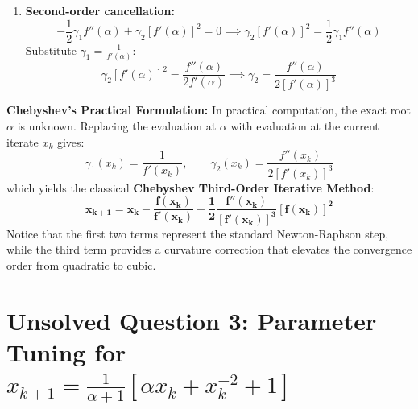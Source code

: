 \documentclass[11pt,a4paper]{article}
\numberwithin{equation}{section}
\begin{document}
\begin{solbox}
\begin{enumerate}[leftmargin=2em]
\begin{equation}
        1 - \gamma_1 f'(\alpha) = 0 \implies \boxed{\gamma_1 = \frac{1}{f'(\alpha)}}
    \end{equation}
    \item \textbf{Second-order cancellation:}
    \begin{equation}
        -\frac{1}{2} \gamma_1 f''(\alpha) + \gamma_2 [f'(\alpha)]^2 = 0 \implies \gamma_2 [f'(\alpha)]^2 = \frac{1}{2} \gamma_1 f''(\alpha)
    \end{equation}
    Substitute $\gamma_1 = \frac{1}{f'(\alpha)}$:
    \begin{equation}
        \gamma_2 [f'(\alpha)]^2 = \frac{f''(\alpha)}{2 f'(\alpha)} \implies \boxed{\gamma_2 = \frac{f''(\alpha)}{2 [f'(\alpha)]^3}}
    \end{equation}
\end{enumerate}
\end{solbox}

\begin{rembox}
\textbf{Chebyshev's Practical Formulation:}
In practical computation, the exact root $\alpha$ is unknown. Replacing the evaluation at $\alpha$ with evaluation at the current iterate $x_k$ gives:
\begin{equation}
    \gamma_1(x_k) = \frac{1}{f'(x_k)}, \qquad \gamma_2(x_k) = \frac{f''(x_k)}{2 [f'(x_k)]^3}
\end{equation}
which yields the classical \textbf{Chebyshev Third-Order Iterative Method}:
\begin{equation}
    \mathbf{x_{k+1} = x_k - \frac{f(x_k)}{f'(x_k)} - \frac{1}{2} \frac{f''(x_k)}{[f'(x_k)]^3} [f(x_k)]^2}
\end{equation}
Notice that the first two terms represent the standard Newton-Raphson step, while the third term provides a curvature correction that elevates the convergence order from quadratic to cubic.
\end{rembox}

\section{Unsolved Question 3: Parameter Tuning for \texorpdfstring{$x_{k+1} = \frac{1}{\alpha + 1}[\alpha x_k + x_k^{-2} + 1]$}{x_{k+1} = 1/(alpha+1) [alpha x_k + 1/x_k^2 + 1]}}
\end{document}
